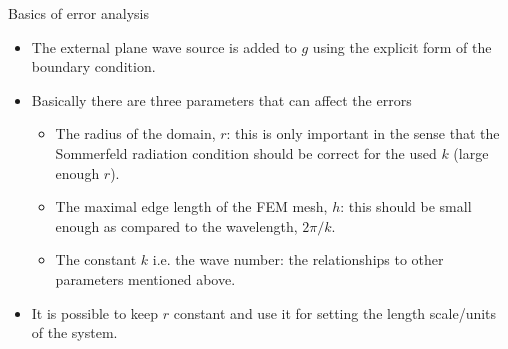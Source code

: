 \documentclass{beamer}
\begin{document}
\begin{frame}{Basics of error analysis}
 \begin{itemize}
  \item The external plane wave source is added to $g$ using the explicit form of the boundary condition.
  \item Basically there are three parameters that can affect the errors
  \begin{itemize}
  \item The radius of the domain, $r$: this is only important in the sense that the Sommerfeld radiation condition
  should be correct for the used $k$ (large enough $r$).
  \item The maximal edge length of the FEM mesh, $h$: this should be small enough as compared to the wavelength,
  $2\pi/k$.
  \item The constant $k$ i.e. the wave number: the relationships to other parameters mentioned above.
  \end{itemize}
  \item It is possible to keep $r$ constant and use it for setting the length scale/units of the system.
 \end{itemize}
\end{frame}
\end{document}
